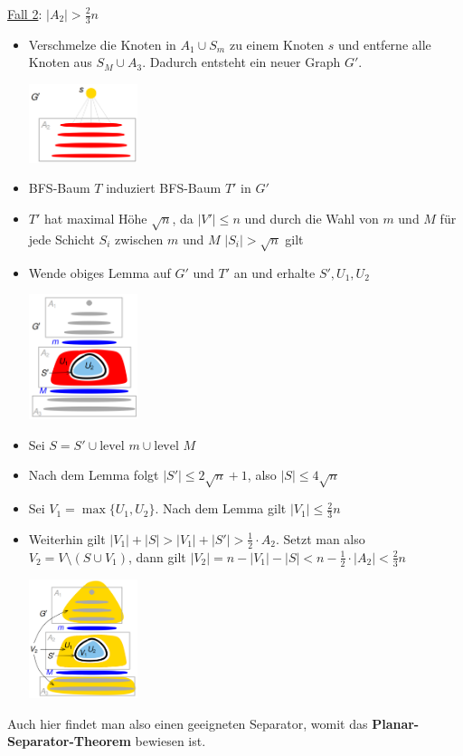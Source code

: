 \underline{Fall 2}: $|A_2|>\frac{2}{3}n$
\begin{itemize}
	\item Verschmelze die Knoten in $A_1\cup S_m$ zu einem Knoten $s$  und entferne alle Knoten aus $S_M\cup A_3$. Dadurch entsteht ein neuer Graph $G'$.
	\begin{center}
		\includegraphics[width=0.25\textwidth]{images/pst-9.png}
	\end{center}
	\item BFS-Baum $T$ induziert BFS-Baum $T'$ in $G'$
	\item $T'$ hat maximal Höhe $\sqrt{n}$, da $|V'|\leq n$ und durch die Wahl von $m$ und $M$ für jede Schicht $S_i$ zwischen $m$ und $M$ $|S_i|>\sqrt{n}$ gilt
	\item Wende obiges Lemma auf $G'$ und $T'$ an und erhalte $S', U_1, U_2$
	\begin{center}
		\includegraphics[width=0.25\textwidth]{images/pst-10.png}
	\end{center}
	\item Sei $S=S'\cup\text{level } m\cup\text{level } M$
	\item Nach dem Lemma folgt $|S'|\leq 2\sqrt{n}+1$, also $|S|\leq4\sqrt{n}$
	\item Sei $V_1=\max\{U_1,U_2\}.$ Nach dem Lemma gilt $|V_1|\leq\frac{2}{3}n$
	\item Weiterhin gilt $|V_1|+|S|>|V_1|+|S'|>\frac{1}{2}\cdot A_2$. Setzt man also $V_2=V\setminus(S\cup V_1)$, dann gilt $|V_2|=n-|V_1|-|S|<n-\frac{1}{2}\cdot |A_2|<\frac{2}{3}n$
	\begin{center}
		\includegraphics[width=0.25\textwidth]{images/pst-11.png}
	\end{center}
\end{itemize}

Auch hier findet man also einen geeigneten Separator, womit das \textbf{Planar-Separator-Theorem} bewiesen ist.

